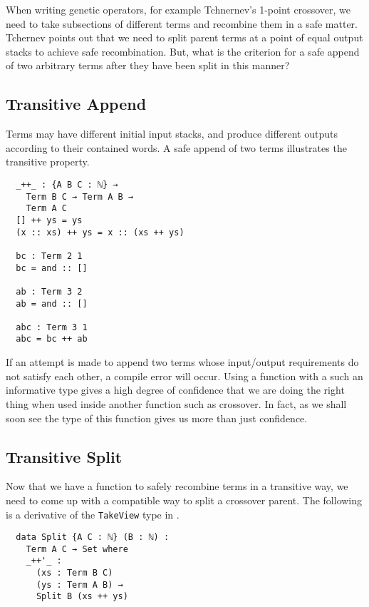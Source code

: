 \documentclass{acm_proc_article-sp}
\begin{document}
When writing genetic operators, for example
Tchnernev's \cite{tchernev:forthcross} 1-point crossover, we need to take
subsections of different terms and recombine them in a safe
matter. Tchernev points out that we need to split parent terms at a
point of equal output stacks to achieve safe recombination. But,
what is the criterion for a safe append of two arbitrary terms after
they have been split in this manner?

\subsection{Transitive Append}

Terms may have different initial input stacks, and produce
different outputs according to their contained words. A safe append
of two terms illustrates the transitive property. 

\begin{verbatim}
  _++_ : {A B C : ℕ} →
    Term B C → Term A B →
    Term A C
  [] ++ ys = ys
  (x :: xs) ++ ys = x :: (xs ++ ys)

  bc : Term 2 1
  bc = and :: []

  ab : Term 3 2
  ab = and :: []

  abc : Term 3 1
  abc = bc ++ ab
\end{verbatim}

If an attempt is made to append two terms whose input/output
requirements do not satisfy each other, a compile error will
occur. Using a function with a such an informative type gives a high
degree of confidence that we are doing the right thing when used
inside another function such as crossover. In fact, as we shall soon
see the type of this function gives us more than just confidence.

\subsection{Transitive Split}

Now that we have a function to safely recombine terms in a transitive
way, we need to come up with a compatible way to split a crossover
parent. The following is a derivative of the \texttt{TakeView} type
in \cite{oury:tpop}.

\begin{verbatim}
  data Split {A C : ℕ} (B : ℕ) :
    Term A C → Set where
    _++'_ :
      (xs : Term B C)
      (ys : Term A B) →
      Split B (xs ++ ys)
\end{verbatim}
\end{document}
